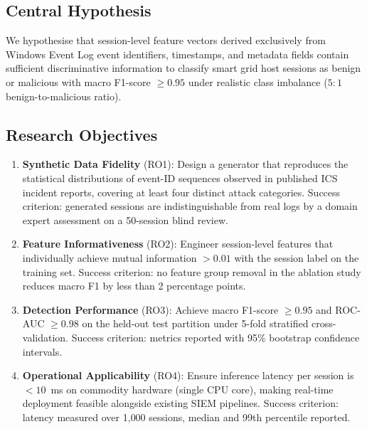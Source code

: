 \label{sec:proposed}

\subsection{Central Hypothesis}

We hypothesise that session-level feature vectors derived exclusively from Windows Event Log
event identifiers, timestamps, and metadata fields contain sufficient discriminative
information to classify smart grid host sessions as benign or malicious with macro
F1-score $\geq 0.95$ under realistic class imbalance ($5:1$ benign-to-malicious ratio).

\subsection{Research Objectives}

\begin{enumerate}
  \item \textbf{Synthetic Data Fidelity} (RO1): Design a generator that reproduces the
        statistical distributions of event-ID sequences observed in published ICS incident
        reports, covering at least four distinct attack categories. Success criterion:
        generated sessions are indistinguishable from real logs by a domain expert
        assessment on a 50-session blind review.

  \item \textbf{Feature Informativeness} (RO2): Engineer session-level features that
        individually achieve mutual information $> 0.01$ with the session label on the
        training set. Success criterion: no feature group removal in the ablation study
        reduces macro F1 by less than 2 percentage points.

  \item \textbf{Detection Performance} (RO3): Achieve macro F1-score $\geq 0.95$ and
        ROC-AUC $\geq 0.98$ on the held-out test partition under 5-fold stratified
        cross-validation. Success criterion: metrics reported with 95\% bootstrap confidence
        intervals.

  \item \textbf{Operational Applicability} (RO4): Ensure inference latency per session is
        $<10$~ms on commodity hardware (single CPU core), making real-time deployment
        feasible alongside existing SIEM pipelines. Success criterion: latency measured over
        1{,}000 sessions, median and 99th percentile reported.
\end{enumerate}

